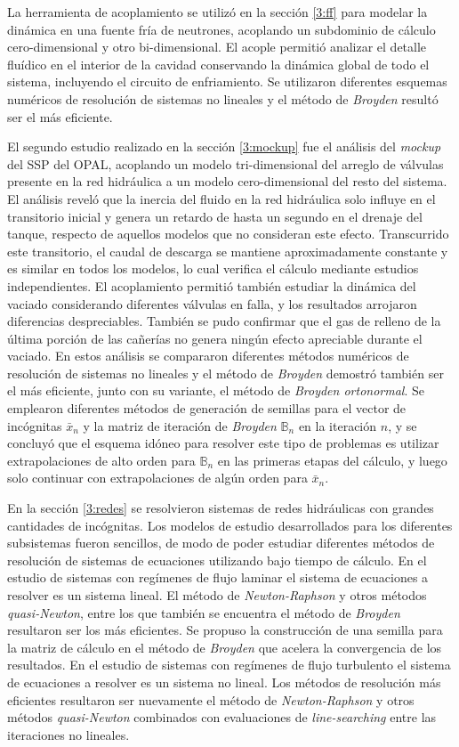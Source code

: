 La herramienta de acoplamiento se utilizó en la sección \ref{3:ff} para modelar la dinámica en una fuente fría de neutrones,
acoplando un subdominio de cálculo cero-dimensional y otro bi-dimensional.
El acople permitió analizar el detalle fluídico en el interior de la cavidad conservando la dinámica global de todo el sistema, incluyendo el circuito de enfriamiento.
Se utilizaron diferentes esquemas numéricos de resolución de sistemas no lineales y el método de \textit{Broyden} resultó ser el más eficiente.

El segundo estudio realizado en la sección \ref{3:mockup} fue el análisis del \textit{mockup} del SSP del OPAL,
acoplando un modelo tri-dimensional del arreglo de válvulas presente en la red hidráulica a un modelo cero-dimensional del resto del sistema.
El análisis reveló que la inercia del fluido en la red hidráulica solo influye en el transitorio inicial y
genera un retardo de hasta un segundo en el drenaje del tanque,
respecto de aquellos modelos que no consideran este efecto.
Transcurrido este transitorio, el caudal de descarga se mantiene aproximadamente constante y es similar en todos los modelos,
lo cual verifica el cálculo mediante estudios independientes.
El acoplamiento permitió también estudiar la dinámica del vaciado considerando diferentes válvulas en falla, y los resultados arrojaron diferencias despreciables.
También se pudo confirmar que el gas de relleno de la última porción de las cañerías no genera ningún efecto apreciable durante el vaciado.
En estos análisis se compararon diferentes métodos numéricos de resolución de sistemas no lineales y el método de \textit{Broyden} demostró también ser el más eficiente,
junto con su variante, el método de \textit{Broyden ortonormal}.
Se emplearon diferentes métodos de generación de semillas para el vector de incógnitas $\bar{x}_n$ y la matriz de iteración de \textit{Broyden} $\mathbb{B}_n$ en la iteración $n$,
y se concluyó que el esquema idóneo para resolver este tipo de problemas es utilizar extrapolaciones de alto orden para $\mathbb{B}_n$ en las primeras etapas del cálculo,
y luego solo continuar con extrapolaciones de algún orden para $\bar{x}_n$.

En la sección \ref{3:redes} se resolvieron sistemas de redes hidráulicas con grandes cantidades de incógnitas.
Los modelos de estudio desarrollados para los diferentes subsistemas fueron sencillos,
de modo de poder estudiar diferentes métodos de resolución de sistemas de ecuaciones utilizando bajo tiempo de cálculo.
En el estudio de sistemas con regímenes de flujo laminar el sistema de ecuaciones a resolver es un sistema lineal.
El método de \textit{Newton-Raphson} y otros métodos \textit{quasi-Newton}, entre los que también se encuentra el método de \textit{Broyden} resultaron ser los más eficientes.
Se propuso la construcción de una semilla para la matriz de cálculo en el método de \textit{Broyden} que acelera la convergencia de los resultados.
En el estudio de sistemas con regímenes de flujo turbulento el sistema de ecuaciones a resolver es un sistema no lineal.
Los métodos de resolución más eficientes resultaron ser nuevamente el método de \textit{Newton-Raphson} y otros métodos \textit{quasi-Newton}
combinados con evaluaciones de \textit{line-searching} entre las iteraciones no lineales.

